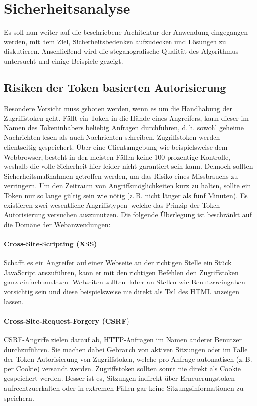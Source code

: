 \section{Sicherheitsanalyse}
Es soll nun weiter auf die beschriebene Architektur der Anwendung eingegangen werden,
mit dem Ziel, Sicherheitsbedenken aufzudecken und Lösungen zu diskutieren.
Anschließend wird die steganografische Qualität des Algorithmus
untersucht und einige Beispiele gezeigt.

\subsection{Risiken der Token basierten Autorisierung}
Besondere Vorsicht muss geboten werden, wenn es um die Handhabung
der Zugriffstoken geht.
Fällt ein Token in die Hände eines Angreifers, kann dieser
im Namen des Tokeninhabers beliebig Anfragen durchführen, d.\,h. sowohl geheime Nachrichten
lesen als auch Nachrichten schreiben.
Zugriffstoken werden clientseitig gespeichert. Über eine
Clientumgebung wie beispielsweise dem Webbrowser, besteht in den meisten
Fällen keine 100-prozentige Kontrolle, weshalb die volle Sicherheit hier leider nicht
garantiert sein kann. Dennoch sollten Sicherheitsmaßnahmen getroffen werden, um
das Risiko eines Missbrauchs zu verringern.
Um den Zeitraum von Angriffsmöglichkeiten kurz zu halten, sollte
ein Token nur so lange gültig sein wie nötig
(z.\,B. nicht länger als fünf Minuten).
Es existieren zwei wesentliche Angriffstypen, welche das Prinzip der Token Autorisierung
versuchen auszunutzen. Die folgende Überlegung ist beschränkt auf die Domäne
der Webanwendungen:

\paragraph{Cross-Site-Scripting (XSS)}
Schafft es ein Angreifer auf einer Webseite an der richtigen Stelle
ein Stück JavaScript auszuführen,
kann er mit den richtigen Befehlen den Zugriffstoken ganz einfach auslesen.
Webseiten sollten daher an Stellen wie Benutzereingaben vorsichtig sein und diese
beispielsweise nie direkt als Teil des HTML anzeigen lassen.

\paragraph{Cross-Site-Request-Forgery (CSRF)}
CSRF-Angriffe zielen darauf ab, HTTP-An\-fragen im
Namen anderer Benutzer durchzuführen. Sie machen dabei Gebrauch von
aktiven Sitzungen oder im Falle der Token Autorisierung von Zugriffstoken,
welche pro Anfrage automatisch (z.\,B. per Cookie) versandt werden.
Zugriffstoken sollten somit nie direkt als Cookie gespeichert werden. Besser
ist es, Sitzungen indirekt über Erneuerungstoken aufrechtzuerhalten oder
in extremen Fällen gar keine Sitzungsinformationen zu speichern.

